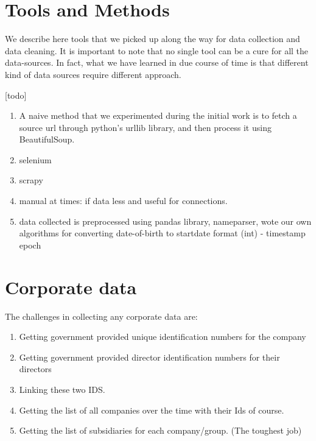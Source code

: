 \section{Tools and Methods}

We describe here tools that we picked up along the way for data collection and data cleaning. It is important to note that no single tool can be a cure for all the data-sources. In fact, what we have learned in due course of time is that different kind of data sources require different approach.

[todo]

\begin{enumerate}

    \item A naive method that we experimented during the initial work is to fetch a source url through python's urllib library, and then process it using BeautifulSoup. 

    \item selenium

    \item scrapy

    \item manual at times: if data less and useful for connections. 

    \item data collected is preprocessed using pandas library, nameparser, wote our own algorithms for converting date-of-birth to startdate format (int) -  timestamp epoch

\end{enumerate}


\section{Corporate data}

The challenges in collecting any corporate data are:

\begin{enumerate}
    \item Getting government provided unique identification numbers for the company
    \item Getting government provided director identification numbers for their directors
    \item Linking these two IDS.
    \item Getting the list of all companies over the time with their Ids of course.
    \item Getting the list of subsidiaries for each company/group. (The toughest job)
\end{enumerate}  

